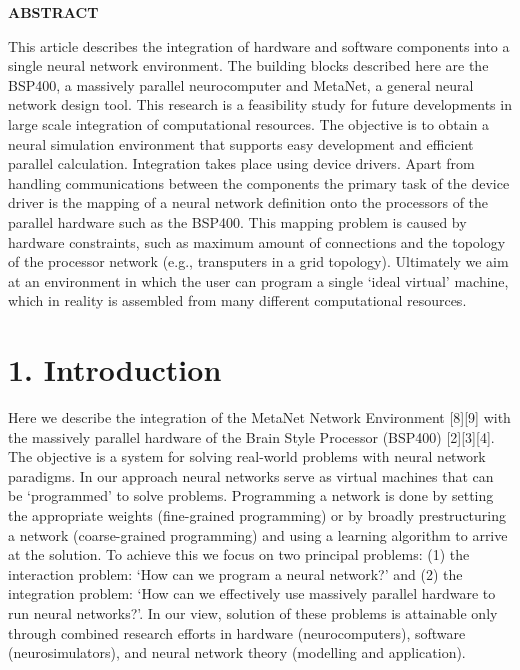 \documentclass[11pt, a4paper]{article}
\begin{document}
\begin{center}
{\bfseries\color{navyaccent} ABSTRACT}
\end{center}
\vspace{-4pt}
\noindent This article describes the integration of hardware and software components into a single neural network environment. The building blocks described here are the BSP400, a massively parallel neurocomputer and MetaNet, a general neural network design tool. This research is a feasibility study for future developments in large scale integration of computational resources. The objective is to obtain a neural simulation environment that supports easy development and efficient parallel calculation. Integration takes place using device drivers. Apart from handling communications between the components the primary task of the device driver is the mapping of a neural network definition onto the processors of the parallel hardware such as the BSP400. This mapping problem is caused by hardware constraints, such as maximum amount of connections and the topology of the processor network (e.g., transputers in a grid topology). Ultimately we aim at an environment in which the user can program a single `ideal virtual' machine, which in reality is assembled from many different computational resources.

\vspace{6pt}

\section*{\color{navyaccent} 1. Introduction}

Here we describe the integration of the MetaNet Network Environment [8][9] with the massively parallel hardware of the Brain Style Processor (BSP400) [2][3][4]. The objective is a system for solving real-world problems with neural network paradigms. In our approach neural networks serve as virtual machines that can be `programmed' to solve problems. Programming a network is done by setting the appropriate weights (fine-grained programming) or by broadly prestructuring a network (coarse-grained programming) and using a learning algorithm to arrive at the solution. To achieve this we focus on two principal problems: (1) the interaction problem: `How can we program a neural network?' and (2) the integration problem: `How can we effectively use massively parallel hardware to run neural networks?'. In our view, solution of these problems is attainable only through combined research efforts in hardware (neurocomputers), software (neurosimulators), and neural network theory (modelling and application).
\end{document}
